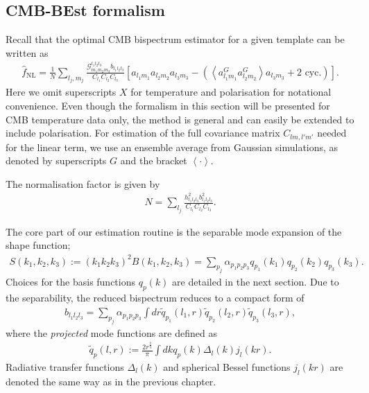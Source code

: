 \subsection{CMB-BEst formalism}
Recall that the optimal CMB bispectrum estimator for a given template can be written as
\begin{align}
	\hat{f}_\text{NL} = \frac{1}{N} \sum_{l_j,m_j} \frac{\mathcal{G}^{l_1 l_2 l_3}_{m_1 m_2 m_3} b_{l_1 l_2 l_3}}{C_{l_1} C_{l_2} C_{l_3}} \left[ a_{l_1 m_1} a_{l_2 m_2} a_{l_3 m_3} - \left( \left< a^G_{l_1 m_1} a^G_{l_2 m_2} \right> a_{l_3 m_3} + \text{2\ cyc.} \right)  \right].		\label{eqn:bispectrum_estimator_standard}
\end{align}
Here we omit superscripts $X$ for temperature and polarisation for notational convenience. Even though the formalism in this section will be presented for CMB temperature data only, the method is general and can easily be extended to include polarisation. For estimation of the full covariance matrix $C_{lm,l'm'}$ needed for the linear term, we use an ensemble average from Gaussian simulations, as denoted by superscripts $G$ and the bracket $\left<\cdot\right>$.

The normalisation factor is given by
\begin{align}
	N = \sum_{l_j} \frac{h_{l_1 l_2 l_3}^2 b_{l_1 l_2 l_3}^2}{C_{l_1} C_{l_2} C_{l_3}}.
\end{align}

The core part of our estimation routine is the separable mode expansion of the shape function;
\begin{align}
	S(k_1, k_2, k_3) := (k_1 k_2 k_3)^2 B(k_1, k_2, k_3) = \sum_{p_j} \alpha_{p_1 p_2 p_3} q_{p_1}(k_1) q_{p_2}(k_2) q_{p_3}(k_3).
\end{align}
Choices for the basis functions $q_p(k)$ are detailed in the next section. Due to the separability, the reduced bispectrum reduces to a compact form of
\begin{align}
	b_{l_1 l_2 l_3} = \sum_{p_j} \alpha_{p_1 p_2 p_3} \int dr \tilde{q}_{p_1}(l_1,r) \tilde{q}_{p_2}(l_2,r) \tilde{q}_{p_3}(l_3,r),
\end{align}
where the \textit{projected} mode functions are defined as
\begin{align}
	\tilde{q}_{p}(l,r) := \frac{2r^\frac{2}{3}}{\pi} \int dk q_p(k) \Delta_l(k) j_l (kr).
\end{align}
Radiative transfer functions $\Delta_l(k)$ and spherical Bessel functions $j_l(kr)$ are denoted the same way as in the previous chapter.

